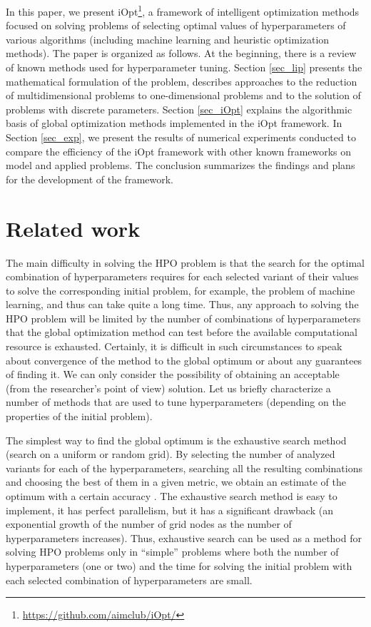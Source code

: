 \documentclass[preprint,12pt]{elsarticle}
\begin{document}
In this paper, we present iOpt\footnote{\url{https://github.com/aimclub/iOpt/}}, a framework of intelligent optimization methods focused on solving problems of selecting optimal values of hyperparameters of various algorithms (including machine learning and heuristic optimization methods). The paper is organized as follows. At the beginning, there is a review of known methods used for hyperparameter tuning. Section \ref{sec_lip} presents the mathematical formulation of the problem, describes approaches to the reduction of multidimensional problems to one-dimensional problems and to the solution of problems with discrete parameters. Section \ref{sec_iOpt} explains the algorithmic basis of global optimization methods implemented in the iOpt framework. In Section \ref{sec_exp}, we present the results of numerical experiments conducted to compare the efficiency of the iOpt framework with other known frameworks on model and applied problems. The conclusion summarizes the findings and plans   for the development of the framework.


\section{Related work}
\label{sec_rel}

The main difficulty in solving the HPO problem is that the search for the optimal combination of hyperparameters requires for each selected variant of their values to solve the corresponding initial problem, for example, the problem of machine learning, and thus can take quite a long time. Thus, any approach to solving the HPO problem will be limited by the number of combinations of hyperparameters that the global optimization method can test before the available computational resource is exhausted.  Certainly, it is difficult in such circumstances to speak about convergence of the method to the global optimum or about any guarantees of finding it. We can only consider the possibility of obtaining an acceptable (from the researcher's point of view) solution. Let us briefly characterize a number of methods that are used to tune hyperparameters (depending on the properties of the initial problem). 

The simplest way to find the global optimum is the exhaustive search method (search on a uniform \cite{Bao2006} or random \cite{Bergstra2012} grid). 
By selecting the number of analyzed variants for each of the hyperparameters, searching all the resulting combinations and choosing the best of them in a given metric, we obtain an estimate of the optimum with a certain accuracy \cite{Nevendra2022}. The exhaustive search method is easy to implement, it has perfect parallelism, but it has a significant drawback (an exponential growth of the number of grid nodes as the number of hyperparameters increases). Thus, exhaustive search can be used as a method for solving HPO problems only in ``simple'' problems where both the number of hyperparameters (one or two) and the time for solving the initial problem with each selected combination of hyperparameters are small. 
\end{document}

